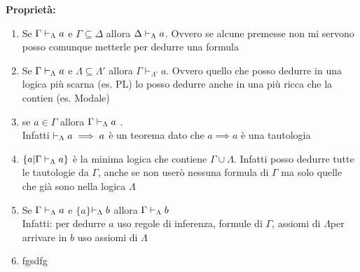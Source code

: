 \textbf{Proprietà:}
\begin{enumerate}
\item Se $\Gamma\vdash_{\Lambda}a$ e $\Gamma\subseteq\Delta$ allora $\Delta\vdash_{\Lambda}a$.
Ovvero se alcune premesse non mi servono posso comunque metterle per
dedurre una formula
\item Se $\Gamma\vdash_{\Lambda}a$ e $\Lambda\subseteq\Lambda'$ allora $\Gamma\vdash_{\Lambda'}a$.
Ovvero quello che posso dedurre in una logica più scarna (es. PL)
lo posso dedurre anche in una più ricca che la contien (es. Modale)
\item se $a\in\Gamma$ allora $\Gamma\vdash_{\Lambda}a$ . \\Infatti $\vdash_{\Lambda}a\implies a$
è un teorema dato che $a\implies a$ è una tautologia
\item $\{a|\Gamma\vdash_{\Lambda}a\}$ è la minima logica che contiene $\Gamma\cup\Lambda$.
Infatti posso dedurre tutte le tautologie da $\Gamma$, anche se non
userò nessuna formula di $\Gamma$ ma solo quelle che già sono nella
logica $\Lambda$
\item Se $\Gamma\vdash_{\Lambda}a$ e $\{a\}$$\vdash_{\Lambda}b$ allora $\Gamma\vdash_{\Lambda}b$ 
\\
Infatti:
per dedurre $a$ uso regole di inferenza, formule di $\Gamma$, assiomi
di $\Lambda$$ $per arrivare in $b$ uso assiomi di $\Lambda$
\item fgsdfg\end{enumerate}


